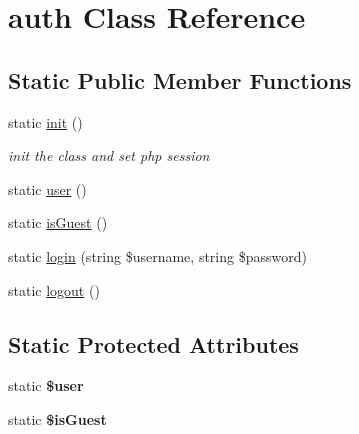\hypertarget{classcommon_1_1user_1_1auth}{\section{auth \-Class \-Reference}
\label{classcommon_1_1user_1_1auth}
}
\subsection*{\-Static \-Public \-Member \-Functions}
\begin{DoxyCompactItemize}
\item 
\hypertarget{classcommon_1_1user_1_1auth_a9f0be6ae273d3669e11c29910a0be338}{static \hyperlink{classcommon_1_1user_1_1auth_a9f0be6ae273d3669e11c29910a0be338}{init} ()}\label{classcommon_1_1user_1_1auth_a9f0be6ae273d3669e11c29910a0be338}

\begin{DoxyCompactList}\small\item\em init the class and set php session \end{DoxyCompactList}\item 
static \hyperlink{classcommon_1_1user_1_1auth_a7949f68385a98a60ff42ea3c3a768ec7}{user} ()
\item 
static \hyperlink{classcommon_1_1user_1_1auth_a3d6c9ff1005fcc403d30d5dd8ef70210}{is\-Guest} ()
\item 
static \hyperlink{classcommon_1_1user_1_1auth_a6f60964b6e0f9798caaf3c0e7c876326}{login} (string \$username, string \$password)
\item 
static \hyperlink{classcommon_1_1user_1_1auth_a1e34160e903835a43123f538e93457a2}{logout} ()
\end{DoxyCompactItemize}
\subsection*{\-Static \-Protected \-Attributes}
\begin{DoxyCompactItemize}
\item 
\hypertarget{classcommon_1_1user_1_1auth_a598ca4e71b15a1313ec95f0df1027ca5}{static {\bfseries \$user}}\label{classcommon_1_1user_1_1auth_a598ca4e71b15a1313ec95f0df1027ca5}

\item 
\hypertarget{classcommon_1_1user_1_1auth_acd6f0a47fb21845165c3716723d50393}{static {\bfseries \$is\-Guest}}\label{classcommon_1_1user_1_1auth_acd6f0a47fb21845165c3716723d50393}

\end{DoxyCompactItemize}


